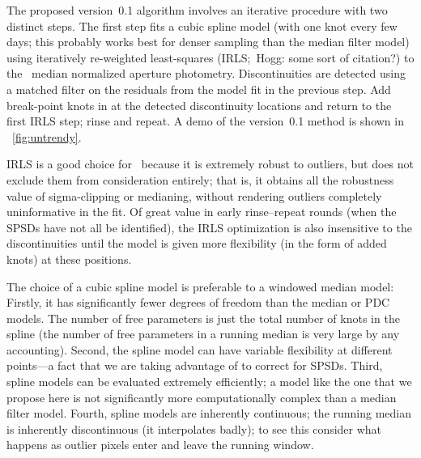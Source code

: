 \documentclass[letterpaper,12pt,preprint]{hack_aastex}
\newcommand{\Untrendy}{\package{Untrendy}}
\begin{document}
The proposed version~0.1 algorithm involves an iterative procedure with two distinct
steps.
The first step fits a cubic spline model (with one knot every few days; this
probably works best for denser sampling than the median filter model) using
iteratively re-weighted least-squares (IRLS;\ Hogg: some sort of citation?) to
the \Kepler\ median normalized aperture photometry.
Discontinuities are detected using a matched filter on the residuals
from the model fit in the previous step.
Add break-point knots in at the detected discontinuity locations and return to the first IRLS
step; rinse and repeat.  A demo of the version~0.1 method is shown in
\figurename~\ref{fig:untrendy}.%

IRLS is a good choice for \Untrendy\ because it is extremely robust to
outliers, but does not exclude them from consideration entirely; that is, it
obtains all the robustness value of sigma-clipping or medianing, without
rendering outliers completely uninformative in the fit.
Of great value in early rinse--repeat rounds (when the SPSDs have not all be identified),
the IRLS optimization is also insensitive to the
discontinuities until the model is given more flexibility (in the form of
added knots) at these positions.

The choice of a cubic spline model is
preferable to a windowed median model:
Firstly, it has significantly fewer degrees of freedom than the median or PDC models.
The number of free parameters is just the total number of knots
in the spline (the number of free parameters in a running median is
very large by any
accounting).
Second, the spline model can have variable flexibility at
different points---a fact that we are taking advantage of to correct for
SPSDs.
Third, spline models can be evaluated extremely efficiently; a model
like the one that we propose here is not significantly more computationally
complex than a median filter model.
Fourth, spline models are inherently continuous; the running median is
inherently discontinuous (it interpolates badly); to see this consider what
happens as outlier pixels enter and leave the running window.
\end{document}
